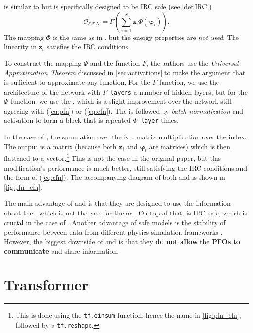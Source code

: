 \EFN is similar to \PFN but is specifically designed to be IRC safe (see \cref{def:IRC})
\begin{equation}
    \label{eq:efn}
    \mathcal{O_{\text{EFN}}} = F\left(\sum_{i=1}^N \pmb{z}_i \Phi(\pmb{\varphi}_i )\right).
\end{equation}
The mapping $\Phi$ is the same as in \PFN, but the \PFO energy properties are \emph{not used}. 
The linearity in $\pmb{z}_i$ satisfies the IRC conditions.

To construct the mapping $\Phi$ and the function $F$, the authors \cite{efn} use the \emph{Universal Approximation Theorem} \cite{universal_app_thm} discussed in \cref{sec:activations} to make the argument that \fc is sufficient to approximate any function.
For the $F$ function, we use the architecture of the \fc network with \texttt{$F$\_layers} a number of hidden layers, but for the $\Phi$ function, we use the \pointCNN \cite{pointCNN}, which is a slight improvement over the \fc network still agreeing with (\ref{eq:pfn}) or (\ref{eq:efn}).
The \pointCNN is followed by \emph{batch normalization} and activation to form a block that is repeated \texttt{$\Phi$\_layer} times.

In the case of \EFN, the summation over the \PFOs is a matrix multiplication over the \PFO index. 
The output is a matrix (because both $\pmb{z}_i$ and $\pmb{\varphi}_i$ are matrices) which is then flattened to a vector.\footnote{This is done using the \texttt{tf.einsum} function, hence the name in \cref{fig:pfn_efn}, followed by a \texttt{tf.reshape}.}
This is not the case in the original paper, but this modification's performance is much better, still satisfying the IRC conditions and the form of (\ref{eq:efn}).
The accompanying diagram of both \PFN and \EFN is shown in \cref{fig:pfn_efn}.


The main advantage of \PFN and \EFN is that they are designed to use the information about the \PFOs, which is not the case for the \fc or \highway.
On top of that, \EFN is IRC-safe, which is crucial in the case of \HEP.
Another advantage of \IRC safe models is the stability of performance between data from different physics simulation frameworks \cite{top_tag}.
However, the biggest downside of \PFN and \EFN is that they \textbf{do not allow} the \textbf{PFOs to communicate} and share information.

\section{Transformer}
\label{sec:transformer}

